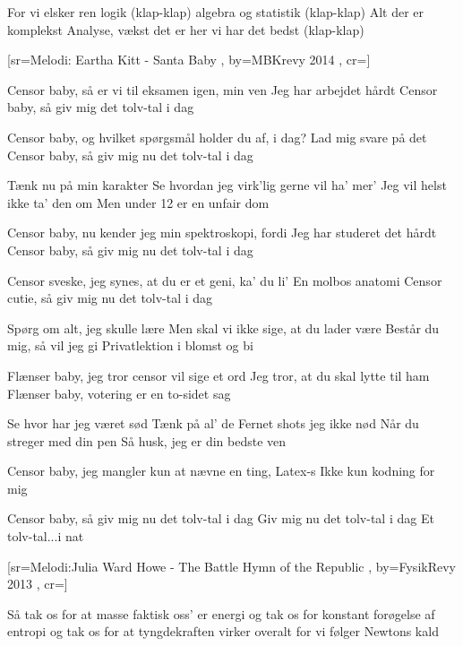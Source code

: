 \documentclass[pdftex,12pt]{article}
\begin{document}
\begin{songs}{}
\beginverse
For vi elsker ren logik (klap-klap)
algebra og statistik (klap-klap)
Alt der er komplekst
Analyse, vækst
det er her vi har det bedst (klap-klap)
\endverse


\endsong



[sr={Melodi: Eartha Kitt - Santa Baby}
,
by={MBKrevy 2014}
,
cr={}]\hypertarget{Censor Baby}{}
\label{song25}

\beginverse
Censor baby, så er vi til eksamen igen, min ven
Jeg har arbejdet hårdt
Censor baby, så giv mig det tolv-tal i dag

\endverse
\beginverse
Censor baby, og hvilket spørgsmål holder du af, i dag?
Lad mig svare på det
Censor baby, så giv mig nu det tolv-tal i dag

\endverse
\beginverse
Tænk nu på min karakter
Se hvordan jeg virk'lig gerne vil ha' mer'
Jeg vil helst ikke ta' den om
Men under 12 er en unfair dom

\endverse
\beginverse
Censor baby, nu kender jeg min spektroskopi, fordi
Jeg har studeret det hårdt
Censor baby, så giv mig nu det tolv-tal i dag

\endverse
\beginverse
Censor sveske, jeg synes, at du er et geni, ka' du li'
En molbos anatomi
Censor cutie, så giv mig nu det tolv-tal i dag

\endverse
\beginverse
Spørg om alt, jeg skulle lære
Men skal vi ikke sige, at du lader være
Består du mig, så vil jeg gi
Privatlektion i blomst og bi

\endverse
\beginverse
Flænser baby, jeg tror censor vil sige et ord
Jeg tror, at du skal lytte til ham
Flænser baby, votering er en to-sidet sag

\endverse
\beginverse
Se hvor har jeg været sød
Tænk på al' de Fernet shots jeg ikke nød
Når du streger med din pen
Så husk, jeg er din bedste ven

\endverse
\beginverse
Censor baby, jeg mangler kun at nævne en ting, Latex-s
Ikke kun kodning for mig

\endverse
\beginverse
Censor baby, så giv mig nu det tolv-tal i dag
Giv mig nu det tolv-tal i dag
Et tolv-tal...i nat

\endverse
\endsong



[sr={Melodi:Julia Ward Howe - The Battle Hymn of the Republic}%
,
by={FysikRevy  2013}
,
cr={}]\hypertarget{Fag Facisme}{}
\label{song26}

\beginverse
Så tak os for at masse faktisk oss' er energi
og tak os for konstant forøgelse af entropi
og tak os for at tyngdekraften virker overalt
for vi følger Newtons kald


\end{songs}
\end{document}
